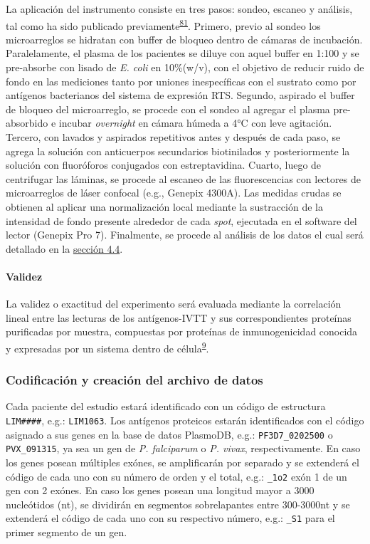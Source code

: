 \documentclass[]{article}
\let\oldparagraph\paragraph
\renewcommand{\paragraph}[1]{\oldparagraph{#1}\mbox{}}
\begin{document}
La aplicación del instrumento consiste en tres pasos: sondeo, escaneo y
análisis, tal como ha sido publicado
previamente\textsuperscript{\protect\hyperlink{ref-Driguez2015}{81}}.
Primero, previo al sondeo los microarreglos se hidratan con buffer de
bloqueo dentro de cámaras de incubación. Paralelamente, el plasma de los
pacientes se diluye con aquel buffer en 1:100 y se pre-absorbe con
lisado de \emph{E. coli} en 10\%(w/v), con el objetivo de reducir ruido
de fondo en las mediciones tanto por uniones inespecíficas con el
sustrato como por antígenos bacterianos del sistema de expresión RTS.
Segundo, aspirado el buffer de bloqueo del microarreglo, se procede con
el sondeo al agregar el plasma pre-absorbido e incubar \emph{overnight}
en cámara húmeda a 4°C con leve agitación. Tercero, con lavados y
aspirados repetitivos antes y después de cada paso, se agrega la
solución con anticuerpos secundarios biotinilados y posteriormente la
solución con fluoróforos conjugados con estreptavidina. Cuarto, luego de
centrifugar las láminas, se procede al escaneo de las fluorescencias con
lectores de microarreglos de láser confocal (e.g., Genepix 4300A). Las
medidas crudas se obtienen al aplicar una normalización local mediante
la sustracción de la intensidad de fondo presente alrededor de cada
\emph{spot}, ejecutada en el software del lector (Genepix Pro 7).
Finalmente, se procede al análisis de los datos el cual será detallado
en la \protect\hyperlink{anadata}{sección 4.4}.

\hypertarget{validez}{\paragraph{Validez}\label{validez}}

La validez o exactitud del experimento será evaluada mediante la
correlación lineal entre las lecturas de los antígenos-IVTT y sus
correspondientes proteínas purificadas por muestra, compuestas por
proteínas de inmunogenicidad conocida y expresadas por un sistema dentro
de célula\textsuperscript{\protect\hyperlink{ref-crompton2010}{9}}.

\subsubsection{Codificación y creación del archivo de
datos}\label{codificacion-y-creacion-del-archivo-de-datos}

Cada paciente del estudio estará identificado con un código de
estructura \texttt{LIM\#\#\#\#}, e.g.: \texttt{LIM1063}. Los antígenos
proteicos estarán identificados con el código asignado a sus genes en la
base de datos PlasmoDB, e.g.: \texttt{PF3D7\_0202500} o
\texttt{PVX\_091315}, ya sea un gen de \emph{P. falciparum} o \emph{P.
vivax}, respectivamente. En caso los genes posean múltiples exónes, se
amplificarán por separado y se extenderá el código de cada uno con su
número de orden y el total, e.g.: \texttt{\_1o2} exón 1 de un gen con 2
exónes. En caso los genes posean una longitud mayor a 3000 nucleótidos
(nt), se dividirán en segmentos sobrelapantes entre 300-3000nt y se
extenderá el código de cada uno con su respectivo número, e.g.:
\texttt{\_S1} para el primer segmento de un gen.
\end{document}
